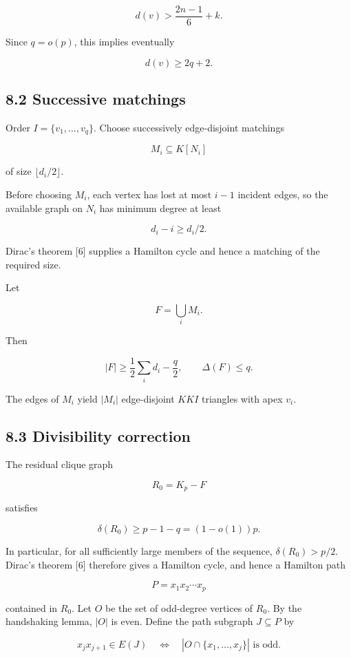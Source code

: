 \documentclass[
  11pt,
]{article}
\begin{document}
\[
d(v)>
\frac{2n-1}{6}+k.
\tag{8.1}
\]

Since \(q=o(p)\), this implies eventually

\[
d(v)\ge2q+2.
\tag{8.2}
\]

\subsection{8.2 Successive matchings}\label{successive-matchings}

Order \(I=\{v_1,\ldots,v_q\}\). Choose successively edge-disjoint
matchings

\[
M_i\subseteq K[N_i]
\]

of size \(\lfloor d_i/2\rfloor\).

Before choosing \(M_i\), each vertex has lost at most \(i-1\) incident
edges, so the available graph on \(N_i\) has minimum degree at least

\[
d_i-i\ge d_i/2.
\]

Dirac's theorem {[}6{]} supplies a Hamilton cycle and hence a matching
of the required size.

Let

\[
F=\bigcup_iM_i.
\]

Then

\[
|F|
\ge
\frac12\sum_i d_i-\frac q2,
\qquad
\Delta(F)\le q.
\tag{8.3}
\]

The edges of \(M_i\) yield \(|M_i|\) edge-disjoint \(KKI\) triangles
with apex \(v_i\).

\subsection{8.3 Divisibility correction}\label{divisibility-correction}

The residual clique graph

\[
R_0=K_p-F
\]

satisfies

\[
\delta(R_0)
\ge
p-1-q
=(1-o(1))p.
\tag{8.4}
\]

In particular, for all sufficiently large members of the sequence,
\(\delta(R_0)>p/2\). Dirac's theorem {[}6{]} therefore gives a Hamilton
cycle, and hence a Hamilton path

\[
P=x_1x_2\cdots x_p
\]

contained in \(R_0\). Let \(O\) be the set of odd-degree vertices of
\(R_0\). By the handshaking lemma, \(|O|\) is even. Define the path
subgraph \(J\subseteq P\) by

\[
x_jx_{j+1}\in E(J)
\quad\Longleftrightarrow\quad
|O\cap\{x_1,\ldots,x_j\}|\text{ is odd}.
\tag{8.5}
\]
\end{document}
